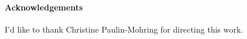 \documentclass{llncs}
\begin{document}
\paragraph{Acknowledgements}
I'd like to thank Christine Paulin-Mohring for directing this work.


\end{document}
